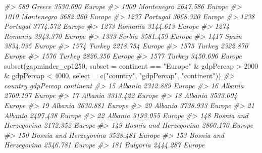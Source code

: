 \documentclass[
]{book}
\newenvironment{Shaded}{\begin{snugshade}}{\end{snugshade}}
\newcommand{\AttributeTok}[1]{\textcolor[rgb]{0.77,0.63,0.00}{#1}}
\newcommand{\CommentTok}[1]{\textcolor[rgb]{0.56,0.35,0.01}{\textit{#1}}}
\newcommand{\DecValTok}[1]{\textcolor[rgb]{0.00,0.00,0.81}{#1}}
\newcommand{\FunctionTok}[1]{\textcolor[rgb]{0.00,0.00,0.00}{#1}}
\newcommand{\NormalTok}[1]{#1}
\newcommand{\SpecialCharTok}[1]{\textcolor[rgb]{0.00,0.00,0.00}{#1}}
\newcommand{\StringTok}[1]{\textcolor[rgb]{0.31,0.60,0.02}{#1}}
\begin{document}
\begin{Shaded}
\begin{Highlighting}[]
\CommentTok{\#\textgreater{} 589                  Greece  3530.690    Europe}
\CommentTok{\#\textgreater{} 1009             Montenegro  2647.586    Europe}
\CommentTok{\#\textgreater{} 1010             Montenegro  3682.260    Europe}
\CommentTok{\#\textgreater{} 1237               Portugal  3068.320    Europe}
\CommentTok{\#\textgreater{} 1238               Portugal  3774.572    Europe}
\CommentTok{\#\textgreater{} 1273                Romania  3144.613    Europe}
\CommentTok{\#\textgreater{} 1274                Romania  3943.370    Europe}
\CommentTok{\#\textgreater{} 1333                 Serbia  3581.459    Europe}
\CommentTok{\#\textgreater{} 1417                  Spain  3834.035    Europe}
\CommentTok{\#\textgreater{} 1574                 Turkey  2218.754    Europe}
\CommentTok{\#\textgreater{} 1575                 Turkey  2322.870    Europe}
\CommentTok{\#\textgreater{} 1576                 Turkey  2826.356    Europe}
\CommentTok{\#\textgreater{} 1577                 Turkey  3450.696    Europe}
\FunctionTok{subset}\NormalTok{(gapminder\_cp1250, }
       \AttributeTok{subset =}\NormalTok{  continent }\SpecialCharTok{==} \StringTok{"Europe"} \SpecialCharTok{\&}\NormalTok{ gdpPercap }\SpecialCharTok{\textgreater{}} \DecValTok{2000} \SpecialCharTok{\&}\NormalTok{ gdpPercap }\SpecialCharTok{\textless{}} \DecValTok{4000}\NormalTok{, }
       \AttributeTok{select =} \FunctionTok{c}\NormalTok{(}\StringTok{"country"}\NormalTok{, }\StringTok{"gdpPercap"}\NormalTok{, }\StringTok{"continent"}\NormalTok{))}
\CommentTok{\#\textgreater{}                     country gdpPercap continent}
\CommentTok{\#\textgreater{} 15                  Albania  2312.889    Europe}
\CommentTok{\#\textgreater{} 16                  Albania  2760.197    Europe}
\CommentTok{\#\textgreater{} 17                  Albania  3313.422    Europe}
\CommentTok{\#\textgreater{} 18                  Albania  3533.004    Europe}
\CommentTok{\#\textgreater{} 19                  Albania  3630.881    Europe}
\CommentTok{\#\textgreater{} 20                  Albania  3738.933    Europe}
\CommentTok{\#\textgreater{} 21                  Albania  2497.438    Europe}
\CommentTok{\#\textgreater{} 22                  Albania  3193.055    Europe}
\CommentTok{\#\textgreater{} 148  Bosnia and Herzegovina  2172.352    Europe}
\CommentTok{\#\textgreater{} 149  Bosnia and Herzegovina  2860.170    Europe}
\CommentTok{\#\textgreater{} 150  Bosnia and Herzegovina  3528.481    Europe}
\CommentTok{\#\textgreater{} 153  Bosnia and Herzegovina  2546.781    Europe}
\CommentTok{\#\textgreater{} 181                Bulgaria  2444.287    Europe}

\end{Highlighting}
\end{Shaded}
\end{document}
